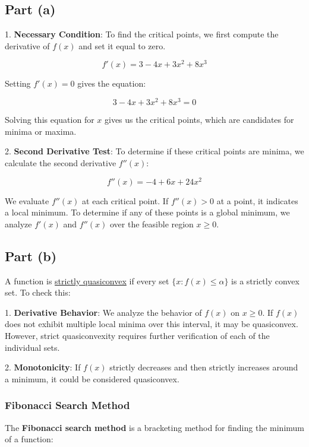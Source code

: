 \documentclass{article}
\begin{document}
\subsection*{Part (a)}

1. \textbf{Necessary Condition}: To find the critical points, we first compute the derivative of \( f(x) \) and set it equal to zero.

   \[
   f'(x) = 3 - 4x + 3x^2 + 8x^3
   \]
   
   Setting \( f'(x) = 0 \) gives the equation:
   
   \[
   3 - 4x + 3x^2 + 8x^3 = 0
   \]
   
   Solving this equation for \( x \) gives us the critical points, which are candidates for minima or maxima.

2. \textbf{Second Derivative Test}: To determine if these critical points are minima, we calculate the second derivative \( f''(x) \):

   \[
   f''(x) = -4 + 6x + 24x^2
   \]

   We evaluate \( f''(x) \) at each critical point. If \( f''(x) > 0 \) at a point, it indicates a local minimum. To determine if any of these points is a global minimum, we analyze \( f'(x) \) and \( f''(x) \) over the feasible region \( x \geq 0 \).

\subsection*{Part (b)}

A function is \underline{strictly quasiconvex} if every set \( \{ x : f(x) \leq \alpha \} \) is a strictly convex set. To check this:

1. \textbf{Derivative Behavior}: We analyze the behavior of \( f(x) \) on \( x \geq 0 \). If \( f(x) \) does not exhibit multiple local minima over this interval, it may be quasiconvex. However, strict quasiconvexity requires further verification of each of the individual sets.

2. \textbf{Monotonicity}: If \( f(x) \) strictly decreases and then strictly increases around a minimum, it could be considered quasiconvex.

\subsubsection*{Fibonacci Search Method}
The \textbf{Fibonacci search method} is a bracketing method for finding the minimum of a function:
\end{document}
